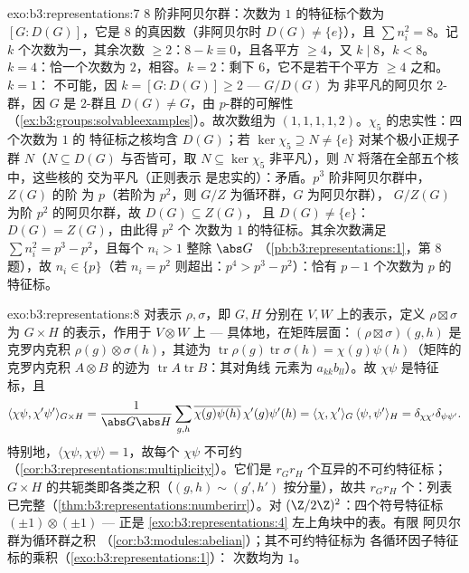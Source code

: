 \begin{solution}{exo:b3:representations:7}
$8$ 阶非阿贝尔群：次数为 $1$ 的特征标个数为
$[G : D(G)]$，它是 $8$ 的真因数（非阿贝尔时 $D(G) \neq
\{e\}$），且 $\sum n_i^2 = 8$。记 $k$ 个次数为一，其余次数
$\geq 2$：$8 - k \equiv 0$，且各平方 $\geq 4$，又 $k
\mid 8$，$k < 8$。$k = 4$：恰一个次数为 $2$，相容。$k =
2$：剩下 $6$，它不是若干个平方 $\geq 4$ 之和。$k = 1$：
不可能，因 $k = [G : D(G)] \geq 2$ --- $G/D(G)$ 为
非平凡的阿贝尔 $2$-群，因 $G$ 是 $2$-群且
$D(G) \neq G$，由 $p$-群的可解性
（\cref{ex:b3:groups:solvableexamples}）。故次数组为
$(1,1,1,1,2)$。$\chi_5$ 的忠实性：四个次数为 $1$ 的
特征标之核均含 $D(G)$；若 $\ker\chi_5
\supseteq N \neq \{e\}$ 对某个极小正规子群 $N$（$N
\subseteq D(G)$ 与否皆可，取 $N \subseteq \ker\chi_5$
非平凡），则 $N$ 将落在全部五个核中，这些核的
交为平凡（正则表示
是忠实的）：矛盾。$p^3$ 阶非阿贝尔群中，$Z(G)$ 的阶
为 $p$（若阶为 $p^2$，则 $G/Z$ 为循环群，$G$ 为阿贝尔群），
$G/Z(G)$ 为阶 $p^2$ 的阿贝尔群，故 $D(G) \subseteq Z(G)$，
且 $D(G) \ne \{e\}$：$D(G) = Z(G)$，由此得 $p^2$ 个
次数为 $1$ 的特征标。其余次数满足 $\sum n_i^2 = p^3 -
p^2$，且每个 $n_i > 1$ 整除 $\abs G$
（\cref{pb:b3:representations:1}，第 8 题），故 $n_i \in
\{p\}$（若 $n_i = p^2$ 则超出：$p^4 > p^3 - p^2$）：恰有 $p
- 1$ 个次数为 $p$ 的特征标。
\end{solution}

\begin{solution}{exo:b3:representations:8}
对表示 $\rho, \sigma$，即 $G, H$ 分别在 $V, W$ 上的表示，定义
$\rho \boxtimes \sigma$ 为 $G \times H$ 的表示，作用于
$V \otimes W$ 上 --- 具体地，在矩阵层面：$(\rho\boxtimes
\sigma)(g,h)$ 是克罗内克积 $\rho(g)\otimes
\sigma(h)$，其迹为
$\operatorname{tr}\rho(g)\operatorname{tr}\sigma(h) =
\chi(g)\psi(h)$（矩阵的克罗内克积 $A \otimes B$
的迹为 $\operatorname{tr}A\operatorname{tr}B$：其对角线
元素为 $a_{kk}b_{ll}$）。故 $\chi\psi$ 是特征标，且
\[
\langle\chi\psi, \chi'\psi'\rangle_{G\times H}
= \frac{1}{\abs G\abs H}\sum_{g,h}
\overline{\chi(g)\psi(h)}\,\chi'(g)\psi'(h)
= \langle\chi,\chi'\rangle_G\,\langle\psi,\psi'\rangle_H
= \delta_{\chi\chi'}\delta_{\psi\psi'}.
\]
特别地，$\langle\chi\psi,\chi\psi\rangle = 1$，故每个
$\chi\psi$ 不可约
（\cref{cor:b3:representations:multiplicity}）。它们是
$r_Gr_H$ 个互异的不可约特征标；
$G\times H$ 的共轭类即各类之积（$(g,h) \sim (g',h')$
按分量），故共 $r_Gr_H$ 个：列表
已完整（\cref{thm:b3:representations:numberirr}）。对
$(\Z/2\Z)^2$：四个符号特征标
$(\pm1)\otimes(\pm1)$ --- 正是
\cref{exo:b3:representations:4} 左上角块中的表。有限
阿贝尔群为循环群之积
（\cref{cor:b3:modules:abelian}）；其不可约特征标为
各循环因子特征标的乘积（\cref{exo:b3:representations:1}）：
次数均为 $1$。
\end{solution}


